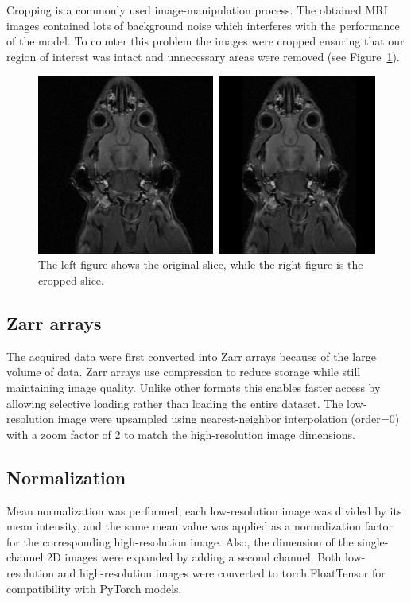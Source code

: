 \documentclass[twocolumn]{article}
\begin{document}
Cropping is a commonly used image-manipulation process. The obtained MRI images contained lots of background noise which interferes with the performance of the model. To counter this problem the images were cropped ensuring that our region of interest was intact and unnecessary areas were removed (see Figure~\ref{fig:comparision-cropped}).  

\begin{figure}
    \centering
    \includegraphics[width=0.85\linewidth]{comparision cropped vs non cropped.png}
    \caption{The left figure shows the original slice, while the right figure is the cropped slice.}
    \label{fig:comparision-cropped}
\end{figure}


\subsection{Zarr arrays}

The acquired data were first converted into Zarr arrays because of the large volume of data. Zarr arrays use compression to reduce storage while still maintaining image quality. Unlike other formats this enables faster access by allowing selective loading rather than loading the entire dataset. The low-resolution image were upsampled using nearest-neighbor interpolation (order=0) with a zoom factor of 2 to match the high-resolution image dimensions. 

\subsection{Normalization}

Mean normalization was performed, each low-resolution image was divided by its mean intensity, and the same mean value was applied as a normalization factor for the corresponding high-resolution image.  Also, the dimension of the single-channel 2D images were expanded by adding a second channel. Both low-resolution and high-resolution images were converted to torch.FloatTensor for compatibility with PyTorch models.
\end{document}
